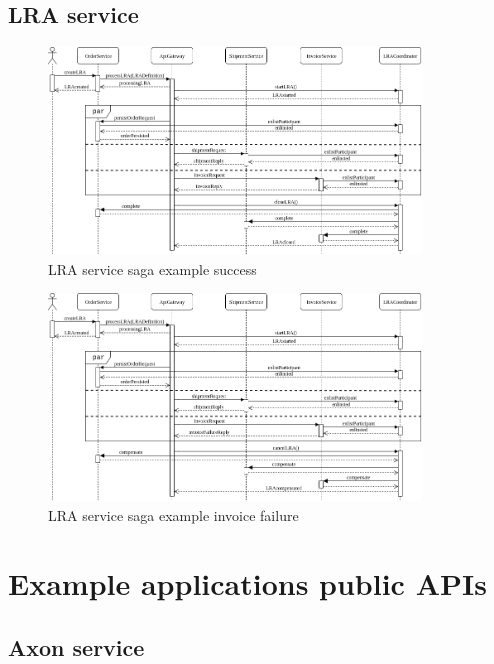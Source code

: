 \documentclass[oneside,
  digital, %
  table,   %
  lof,     %
  lot,     %
]{fithesis3}
\begin{document}
\clearpage
\section{LRA service}

\begin{figure}[h]
    \begin{center}
        \includegraphics[height=55mm]{images/sequence/validSagaLRA.png}
    \end{center}
    \caption{LRA service saga example success}
\end{figure}

\hfill \break

\begin{figure}[h]
    \begin{center}
        \includegraphics[height=55mm]{images/sequence/invoiceFailSagaLRA.png}
    \end{center}
    \caption{LRA service saga example invoice failure}
\end{figure}


\clearpage
\chapter{Example applications public APIs}
\label{sec:appendixAPI}

\section{Axon service}
\end{document}
